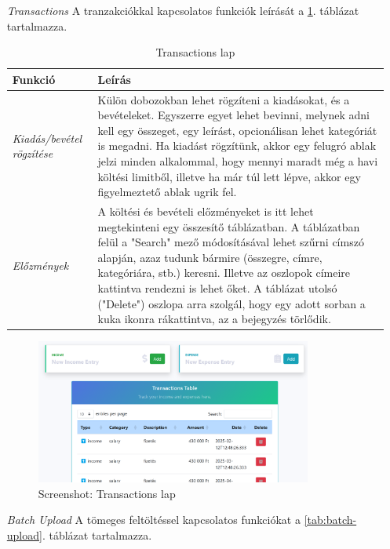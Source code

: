 \pagebreak
\begin{itemize}
	\item[\emph{Transactions}]
	A tranzakciókkal kapcsolatos funkciók leírását a \ref{tab:transactions}. táblázat tartalmazza.
	\begin{table}[H]
		\centering
		\begin{tabular}{ | m{} | m{} | }
			\hline
			\textbf{Funkció} & \textbf{Leírás} \\
			\hline \hline
			\emph{Kiadás/bevétel rögzítése} & Külön dobozokban lehet rögzíteni a kiadásokat, és a bevételeket. Egyszerre egyet lehet bevinni, melynek adni kell egy összeget, egy leírást, opcionálisan lehet kategóriát is megadni. Ha kiadást rögzítünk, akkor egy felugró ablak jelzi minden alkalommal, hogy mennyi maradt még a havi költési limitből, illetve ha már túl lett lépve, akkor egy figyelmeztető ablak ugrik fel. \\
			\hline
			\emph{Előzmények} &  A költési és bevételi előzményeket is itt lehet megtekinteni egy összesítő táblázatban. A táblázatban felül a "Search" mező módosításával lehet szűrni címszó alapján, azaz tudunk bármire (összegre, címre, kategóriára, stb.) keresni. Illetve az oszlopok címeire kattintva rendezni is lehet őket. A táblázat utolsó ("Delete") oszlopa arra szolgál, hogy egy adott sorban a kuka ikonra rákattintva, az a bejegyzés törlődik.  \\
			\hline
		\end{tabular}
		\caption{Transactions lap}
		\label{tab:transactions}
	\end{table}
	\begin{figure}[H]
		\centering
		\includegraphics[height=180px]{img/transactions}
		\caption{Screenshot: Transactions lap}
		\label{fig:transactions}
	\end{figure}
	\pagebreak
	\item[\emph{Batch Upload}] 
	A tömeges feltöltéssel kapcsolatos funkciókat a \ref{tab:batch-upload}. táblázat tartalmazza.
	\begin{table}[H]

\end{table}
\end{itemize}
